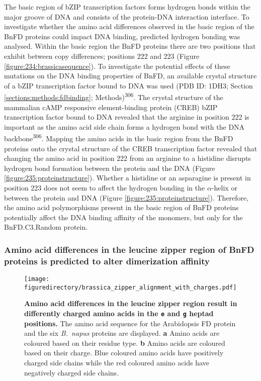 \documentclass[12pt,]{book}
\begin{document}
The basic region of bZIP transcription factors forms hydrogen bonds
within the major groove of DNA and consists of the protein-DNA
interaction interface. To investigate whether the amino acid differences
observed in the basic region of the BnFD proteins could impact DNA
binding, predicted hydrogen bonding was analysed. Within the basic
region the BnFD proteins there are two positions that exhibit between
copy differences; positions 222 and 223 (Figure
\ref{figure:234:brassicasequence}). To investigate the potential effects
of these mutations on the DNA binding properties of BnFD, an available
crystal structure of a bZIP transcription factor bound to DNA was used
(PDB ID: 1DH3; Section \ref{sections:methods:fdbinding};
Methods)\textsuperscript{306}. The crystal structure of the mammalian
cAMP responsive element-binding protein (CREB) bZIP transcription factor
bound to DNA revealed that the arginine in position 222 is important as
the amino acid side chain forms a hydrogen bond with the DNA
backbone\textsuperscript{306}. Mapping the amino acids in the basic
region from the BnFD proteins onto the crystal structure of the CREB
transcription factor revealed that changing the amino acid in position
222 from an arginine to a histidine disrupts hydrogen bond formation
between the protein and the DNA (Figure
\ref{figure:235:proteinstructure}). Whether a histidine or an asparagine
is present in position 223 does not seem to affect the hydrogen bonding
in the \(\alpha\)-helix or between the protein and DNA (Figure
\ref{figure:235:proteinstructure}). Therefore, the amino acid
polymorphisms present in the basic region of BnFD proteins potentially
affect the DNA binding affinity of the monomers, but only for the
BnFD.C3.Random protein.

\subsubsection{Amino acid differences in the leucine zipper region of
BnFD proteins is predicted to alter dimerization
affinity}\label{section:spring:fddimerizationprediction}

\begin{figure}[htbp]
\centering
\texttt{[image: figuredirectory/brassica\_zipper\_alignment\_with\_charges.pdf]}
\caption{\textbf{Amino acid differences in the leucine zipper region
result in differently charged amino acids in the \texttt{e} and
\texttt{g} heptad positions.} The amino acid sequence for the
Arabidopsis FD protein and the six \emph{B.~napus} proteins are
displayed. \textbf{a} Amino acids are coloured based on their residue
type. \textbf{b} Amino acids are coloured based on their charge. Blue
coloured amino acids have positively charged side chains while the red
coloured amino acids have negatively charged side
chains.}\label{figure:236a:leucinezipper}
\end{figure}
\end{document}
